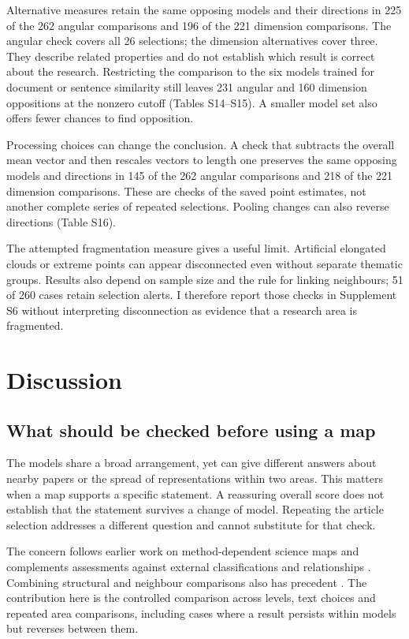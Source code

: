 \documentclass[12pt]{article}
\begin{document}
Alternative measures retain the same opposing models and their directions in 225 of the 262 angular comparisons and 196 of the 221 dimension comparisons. The angular check covers all 26 selections; the dimension alternatives cover three. They describe related properties and do not establish which result is correct about the research. Restricting the comparison to the six models trained for document or sentence similarity still leaves 231 angular and 160 dimension oppositions at the nonzero cutoff (Tables S14--S15). A smaller model set also offers fewer chances to find opposition.

Processing choices can change the conclusion. A check that subtracts the overall mean vector and then rescales vectors to length one preserves the same opposing models and directions in 145 of the 262 angular comparisons and 218 of the 221 dimension comparisons. These are checks of the saved point estimates, not another complete series of repeated selections. Pooling changes can also reverse directions (Table S16).

The attempted fragmentation measure gives a useful limit. Artificial elongated clouds or extreme points can appear disconnected even without separate thematic groups. Results also depend on sample size and the rule for linking neighbours; 51 of 260 cases retain selection alerts. I therefore report those checks in Supplement S6 without interpreting disconnection as evidence that a research area is fragmented.

\FloatBarrier
\section{Discussion}
\subsection{What should be checked before using a map}
The models share a broad arrangement, yet can give different answers about nearby papers or the spread of representations within two areas. This matters when a map supports a specific statement. A reassuring overall score does not establish that the statement survives a change of model. Repeating the article selection addresses a different question and cannot substitute for that check.

The concern follows earlier work on method-dependent science maps \citep{refa0d2d707e6,ref6a2f5912bc} and complements assessments against external classifications and relationships \citep{refbe130e2973,refc0e2cc29e0}. Combining structural and neighbour comparisons also has precedent \citep{ref4e1e0d5582}. The contribution here is the controlled comparison across levels, text choices and repeated area comparisons, including cases where a result persists within models but reverses between them.
\end{document}
